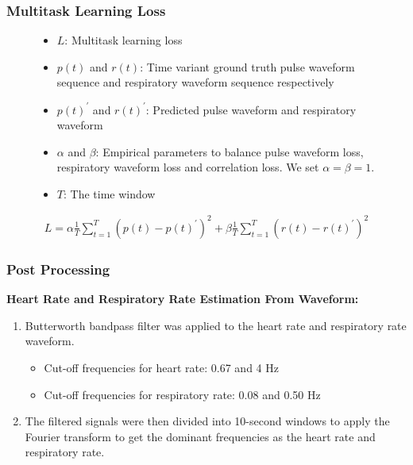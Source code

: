 \documentclass[aspectratio=169, table]{beamer}
\begin{document}
\begin{frame}
\frametitle{\textbf{Multitask Learning Loss}}\small

\vspace*{7mm}
\begin{figure}[h!]
  		\centering
  		\begin{minipage}[l]{.80\textwidth}
  			    \begin{itemize}	
  			        \item $L$: Multitask learning loss
  			        \item $p(t)$ and $r(t)$: Time variant ground truth pulse waveform sequence and respiratory waveform sequence respectively
  			        \item $p(t)^{'}$ and $r(t)^{'}$: Predicted pulse waveform and respiratory waveform
  			        \item $\alpha$ and $\beta$: Empirical parameters to balance pulse waveform loss, respiratory waveform loss and correlation loss. We set $\alpha=\beta=1$.
  			        
  			        \item $T$: The time window
  			   \end{itemize}
              \begin{equation*}\boxed{
                 \begin{split}
                 \textit{L} = \alpha \frac{1}{T} \sum_{t = 1}^{T}(p(t) - p(t)^{'})^{2} + \beta \frac{1}{T} \sum_{t = 1}^{T}(r(t) - r(t)^{'})^{2}
                \end{split}}
                \end{equation*}
       \end{minipage}
  		\hfill
\end{figure}

\end{frame}
\begin{frame}
\frametitle{\textbf{Post Processing}}\small
\textbf{Heart Rate and Respiratory Rate Estimation From Waveform:}
\begin{enumerate}
    \item Butterworth bandpass filter was applied to the heart rate and respiratory rate waveform.
    \begin{itemize}
    \item Cut-off frequencies for heart rate: 0.67 and 4 Hz
    \item Cut-off frequencies for respiratory rate: 0.08 and 0.50 Hz
    \end{itemize}
    \item The filtered signals were then divided into 10-second windows to apply the Fourier transform to get the dominant frequencies as the heart rate and respiratory rate.
\end{enumerate}

\end{frame}
\end{document}
